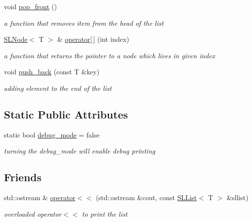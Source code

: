 \begin{DoxyCompactItemize}
void \mbox{\hyperlink{classSLList_a081a289755af55c21a9cf89f21b48834}{pop\+\_\+front}} ()
\begin{DoxyCompactList}\small\item\em a function that removes item from the head of the list \end{DoxyCompactList}\item 
\mbox{\hyperlink{classSLNode}{S\+L\+Node}}$<$ T $>$ \& \mbox{\hyperlink{classSLList_a9099e03575aa4acf37a5885d227a96cf}{operator\mbox{[}$\,$\mbox{]}}} (int index)
\begin{DoxyCompactList}\small\item\em a function that returns the pointer to a node which lives in given index \end{DoxyCompactList}\item 
void \mbox{\hyperlink{classSLList_a4e92731d47c5b3a393ecd2e44de14456}{push\+\_\+back}} (const T \&key)
\begin{DoxyCompactList}\small\item\em adding element to the end of the list \end{DoxyCompactList}\end{DoxyCompactItemize}
\subsection*{Static Public Attributes}
\begin{DoxyCompactItemize}
\item 
\mbox{\label{classSLList_ab3c625e93aab3a4f7960720e8a7b06a3}} 
static bool \mbox{\hyperlink{classSLList_ab3c625e93aab3a4f7960720e8a7b06a3}{debug\+\_\+mode}} = false
\begin{DoxyCompactList}\small\item\em turning the debug\+\_\+mode will enable debug printing \end{DoxyCompactList}\end{DoxyCompactItemize}
\subsection*{Friends}
\begin{DoxyCompactItemize}
\item 
\mbox{\label{classSLList_aa8cfe845c51e07dcd3da8f9b5398089b}} 
std\+::ostream \& \mbox{\hyperlink{classSLList_aa8cfe845c51e07dcd3da8f9b5398089b}{operator$<$$<$}} (std\+::ostream \&cout, const \mbox{\hyperlink{classSLList}{S\+L\+List}}$<$ T $>$ \&sllist)
\begin{DoxyCompactList}\small\item\em overloaded operator$<$$<$ to print the list \end{DoxyCompactList}\end{DoxyCompactItemize}



